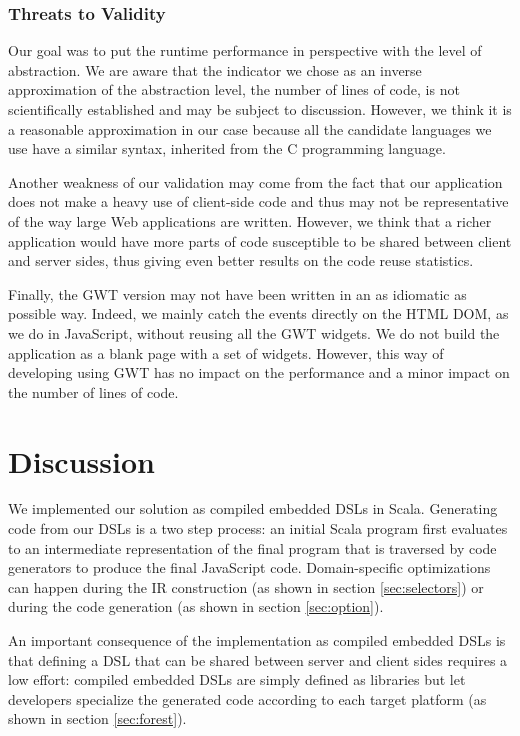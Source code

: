 \documentclass[preprint]{sigplanconf}
\begin{document}
\subsubsection{Threats to Validity}

Our goal was to put the runtime performance in perspective with the level of abstraction. We are
aware that the indicator we chose as an inverse approximation of the abstraction level, the number
of lines of code, is not scientifically established and may be subject to discussion. However, we
think it is a reasonable approximation in our case because all the candidate languages we use have
a similar syntax, inherited from the C programming language.

Another weakness of our validation may come from the fact that our application does not make a
heavy use of client-side code and thus may not be representative of the way large Web applications
are written. However, we think that a richer application would have more parts of code susceptible
to be shared between client and server sides, thus giving even better results on the code reuse
statistics.

Finally, the GWT version may not have been written in an as idiomatic as possible way. 
Indeed, we mainly catch the events directly on the HTML DOM, as we do in JavaScript, without
reusing all the GWT widgets. We do not build the application as a blank page with a set of
widgets. However, this way of developing using GWT has no impact on the performance and a minor
impact on the number of lines of code.

\section{Discussion}
\label{sec:discussion}

We implemented our solution as compiled embedded DSLs in Scala. Generating code from our DSLs is a
two step process: an initial Scala program first evaluates to an intermediate representation of
the final program that is traversed by code generators to produce the final JavaScript code.
Domain-specific optimizations can happen during the IR construction (as shown in section
\ref{sec:selectors}) or during the code generation (as shown in section \ref{sec:option}).

An important consequence of the implementation as compiled embedded DSLs is that defining a DSL
that can be shared between server and client sides requires a low effort: compiled embedded DSLs are
simply defined as libraries but let developers specialize the generated code according to each
target platform (as shown in section \ref{sec:forest}).
\end{document}
